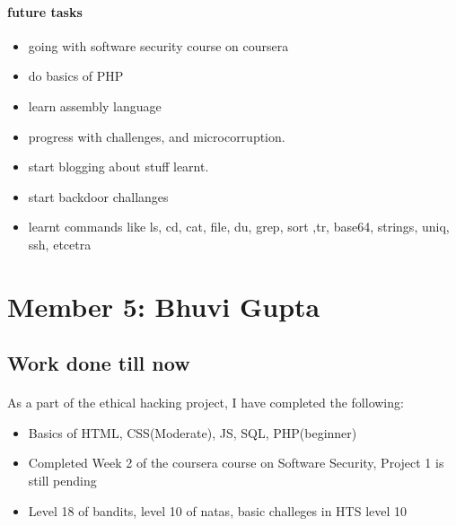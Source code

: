 \documentclass{article}
\begin{document}
\begin{itemize}
\begin{itemize}
\begin{itemize}
                \paragraph{future tasks}
                \begin{itemize}
                    \item going with software security course on coursera
                    \item do basics of PHP
                    \item learn assembly language
                    \item progress with challenges, and microcorruption. 
                    \item start blogging about stuff learnt.
                    \item start backdoor challanges
                \end{itemize}
        \end{itemize}
        \begin{itemize}
            \item learnt commands like ls, cd, cat, file, du, grep, sort ,tr, base64, strings, uniq, ssh, etcetra
        \end{itemize}

\end{itemize}
\end{itemize}
\newpage
\section*{Member 5: Bhuvi Gupta}
\subsection*{Work done till now}
\paragraph{}
As a part of the ethical hacking project, I have completed the following:
\begin{itemize}
    \item Basics of HTML, CSS(Moderate), JS, SQL, PHP(beginner)
    \item Completed Week 2 of the coursera course on Software Security, Project 1 is still pending
    \item Level 18 of bandits, level 10 of natas, basic challeges in HTS level 10
\end{itemize}
\end{document}
